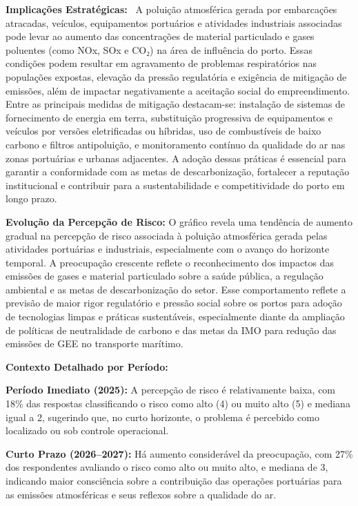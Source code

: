 \documentclass[
  portuguese,
  letterpaper,
  DIV=11,
  numbers=noendperiod]{scrreprt}
\begin{document}
\begin{tcolorbox}
\hfill\break
\textbf{Implicações Estratégicas:}~ A poluição atmosférica gerada por
embarcações atracadas, veículos, equipamentos portuários e atividades
industriais associadas pode levar ao aumento das concentrações de
material particulado e gases poluentes (como NOx, SOx e CO₂) na área de
influência do porto. Essas condições podem resultar em agravamento de
problemas respiratórios nas populações expostas, elevação da pressão
regulatória e exigência de mitigação de emissões, além de impactar
negativamente a aceitação social do empreendimento. Entre as principais
medidas de mitigação destacam-se: instalação de sistemas de fornecimento
de energia em terra, substituição progressiva de equipamentos e veículos
por versões eletrificadas ou híbridas, uso de combustíveis de baixo
carbono e filtros antipoluição, e monitoramento contínuo da qualidade do
ar nas zonas portuárias e urbanas adjacentes. A adoção dessas práticas é
essencial para garantir a conformidade com as metas de descarbonização,
fortalecer a reputação institucional e contribuir para a
sustentabilidade e competitividade do porto em longo prazo.

\textbf{Evolução da Percepção de Risco:} O gráfico revela uma tendência
de aumento gradual na percepção de risco associada à poluição
atmosférica gerada pelas atividades portuárias e industriais,
especialmente com o avanço do horizonte temporal. A preocupação
crescente reflete o reconhecimento dos impactos das emissões de gases e
material particulado sobre a saúde pública, a regulação ambiental e as
metas de descarbonização do setor. Esse comportamento reflete a previsão
de maior rigor regulatório e pressão social sobre os portos para adoção
de tecnologias limpas e práticas sustentáveis, especialmente diante da
ampliação de políticas de neutralidade de carbono e das metas da IMO
para redução das emissões de GEE no transporte marítimo.

\textbf{Contexto Detalhado por Período:}

\textbf{Período Imediato (2025):} A percepção de risco é relativamente
baixa, com 18\% das respostas classificando o risco como alto (4) ou
muito alto (5) e mediana igual a 2, sugerindo que, no curto horizonte, o
problema é percebido como localizado ou sob controle operacional.

\textbf{Curto Prazo (2026--2027):} Há aumento considerável da
preocupação, com 27\% dos respondentes avaliando o risco como alto ou
muito alto, e mediana de 3, indicando maior consciência sobre a
contribuição das operações portuárias para as emissões atmosféricas e
seus reflexos sobre a qualidade do ar.


\end{tcolorbox}
\end{document}
